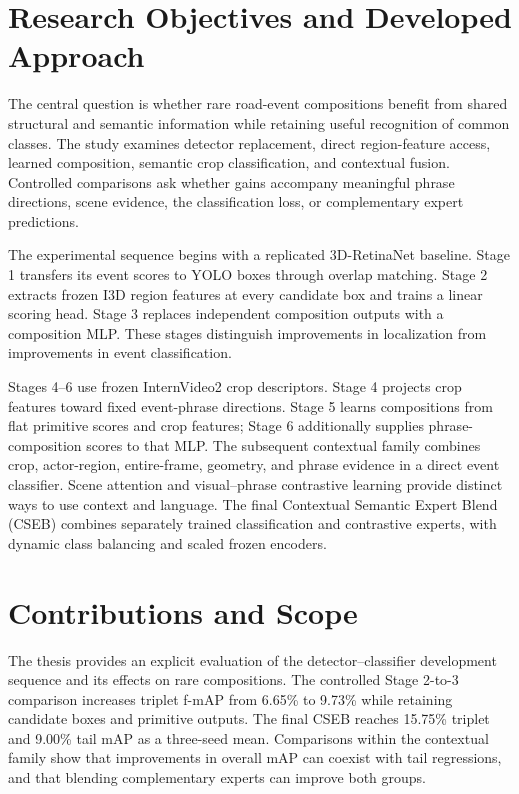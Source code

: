 \section{Research Objectives and Developed Approach}

The central question is whether rare road-event compositions benefit from shared structural and semantic information while retaining useful recognition of common classes. The study examines detector replacement, direct region-feature access, learned composition, semantic crop classification, and contextual fusion. Controlled comparisons ask whether gains accompany meaningful phrase directions, scene evidence, the classification loss, or complementary expert predictions.

The experimental sequence begins with a replicated 3D-RetinaNet baseline. Stage 1 transfers its event scores to YOLO boxes through overlap matching. Stage 2 extracts frozen I3D region features at every candidate box and trains a linear scoring head. Stage 3 replaces independent composition outputs with a composition MLP. These stages distinguish improvements in localization from improvements in event classification.

Stages 4--6 use frozen InternVideo2 crop descriptors. Stage 4 projects crop features toward fixed event-phrase directions. Stage 5 learns compositions from flat primitive scores and crop features; Stage 6 additionally supplies phrase-composition scores to that MLP. The subsequent contextual family combines crop, actor-region, entire-frame, geometry, and phrase evidence in a direct event classifier. Scene attention and visual--phrase contrastive learning provide distinct ways to use context and language. The final Contextual Semantic Expert Blend (CSEB) combines separately trained classification and contrastive experts, with dynamic class balancing and scaled frozen encoders.

\section{Contributions and Scope}

The thesis provides an explicit evaluation of the detector--classifier development sequence and its effects on rare compositions. The controlled Stage 2-to-3 comparison increases triplet f-mAP from 6.65\% to 9.73\% while retaining candidate boxes and primitive outputs. The final CSEB reaches 15.75\% triplet and 9.00\% tail mAP as a three-seed mean. Comparisons within the contextual family show that improvements in overall mAP can coexist with tail regressions, and that blending complementary experts can improve both groups.

